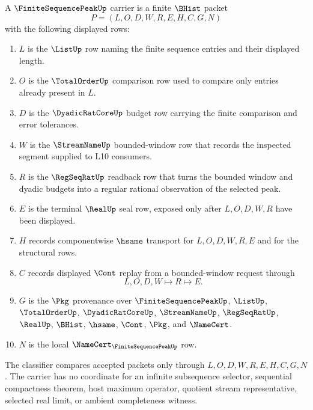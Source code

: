 \begin{definition}
\label{def:finite-sequence-peak-carrier}
A $\FiniteSequencePeakUp$ carrier is a finite $\BHist$ packet
$$
P=(L,O,D,W,R,E,H,C,G,N)
$$
with the following displayed rows:
\begin{enumerate}
\item $L$ is the $\ListUp$ row naming the finite sequence entries and their displayed length.
\item $O$ is the $\TotalOrderUp$ comparison row used to compare only entries already present in $L$.
\item $D$ is the $\DyadicRatCoreUp$ budget row carrying the finite comparison and error tolerances.
\item $W$ is the $\StreamNameUp$ bounded-window row that records the inspected segment supplied to L10 consumers.
\item $R$ is the $\RegSeqRatUp$ readback row that turns the bounded window and dyadic budgets into a regular rational observation of the selected peak.
\item $E$ is the terminal $\RealUp$ seal row, exposed only after $L,O,D,W,R$ have been displayed.
\item $H$ records componentwise $\hsame$ transport for $L,O,D,W,R,E$ and for the structural rows.
\item $C$ records displayed $\Cont$ replay from a bounded-window request through
$$
L,O,D,W \longmapsto R \longmapsto E .
$$
\item $G$ is the $\Pkg$ provenance over $\FiniteSequencePeakUp$, $\ListUp$, $\TotalOrderUp$, $\DyadicRatCoreUp$, $\StreamNameUp$, $\RegSeqRatUp$, $\RealUp$, $\BHist$, $\hsame$, $\Cont$, $\Pkg$, and $\NameCert$.
\item $N$ is the local $\NameCert_{\FiniteSequencePeakUp}$ row.
\end{enumerate}
The classifier compares accepted packets only through $L,O,D,W,R,E,H,C,G,N$. The carrier has no coordinate for an infinite subsequence selector, sequential compactness theorem, host maximum operator, quotient stream representative, selected real limit, or ambient completeness witness.
\end{definition}

